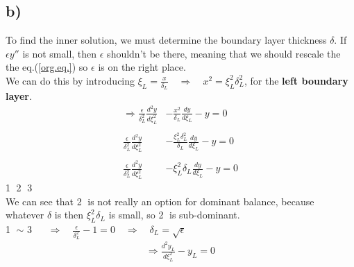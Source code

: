 \documentclass[a4paper,10pt]{article}
\begin{document}
\subsection*{b)} To find the inner solution, we must determine the boundary layer thickness $\delta$. If $\epsilon y''$ is not small, then $\epsilon$ shouldn't be there, meaning that we should rescale the the eq.(\ref{org.eq.}) so $\epsilon$ is on the right place.\\
We can do this by introducing $\xi_L = \frac{x}{\delta_L}\quad \Rightarrow \quad x^2 = \xi_L^2 \delta_L^2$, for the \textbf{left boundary layer}.\\
\begin{align*}
\Rightarrow \frac{\epsilon}{\delta_L^2} \frac{d^2 y}{d \xi_L^2} 
&- \frac{x^2}{\delta_L} \frac{d y}{d \xi_L} - y = 0\\\\
\frac{\epsilon}{\delta_L^2} \frac{d^2 y}{d \xi_L^2} 
&- \frac{\xi_L^2 \delta_L^2}{\delta_L} \frac{d y}{d \xi_L} - y = 0\\\\
\frac{\epsilon}{\delta_L^2} \frac{d^2 y}{d \xi_L^2} 
&- \xi_L^2 \delta_L \frac{d y}{d \xi_L} - y = 0
\end{align*}
\hspace{6.8cm} \textcircled{1} \hspace{9mm} \textcircled{2} \hspace{7mm} \textcircled{3}\\
\vspace{2mm}
We can see that \textcircled{2} is not really an option for dominant balance, because whatever $\delta$ is then $\xi_L^2 \delta_L$ is small, so \textcircled{2} is sub-dominant.\\
\vspace{4mm}
\hspace{5.6cm}\textcircled{1} $\sim$ \textcircled{3}
$\quad \Rightarrow \quad \frac{\epsilon}{\delta_L^2}-1=0 \quad \Rightarrow \quad \delta_L = \sqrt{\epsilon}$\\

\begin{align}
\Rightarrow \frac{d^2 y_L}{d \xi_L^2} - y_L = 0 \label{left.eq.}
\end{align}
\end{document}

